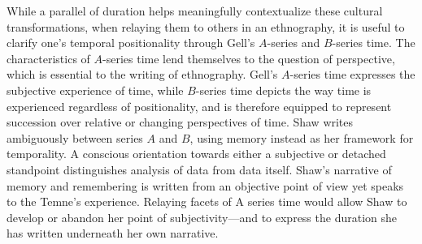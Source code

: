 While a parallel of duration helps meaningfully contextualize these
cultural transformations, when relaying them to others in an
ethnography, it is useful to clarify one's temporal positionality
through Gell's $A$-series and $B$-series time. The characteristics of
$A$-series time lend themselves to the question of perspective, which is
essential to the writing of ethnography. Gell's $A$-series time expresses
the subjective experience of time, while $B$-series time depicts the way
time is experienced regardless of positionality, and is therefore
equipped to represent succession over relative or changing perspectives
of time. Shaw writes ambiguously between series $A$ and $B$, using memory
instead as her framework for temporality. A conscious orientation
towards either a subjective or detached standpoint distinguishes
analysis of data from data itself. Shaw's narrative of memory and
remembering is written from an objective point of view yet speaks to the
Temne's experience. Relaying facets of A series time would allow Shaw to
develop or abandon her point of subjectivity---and to express the
duration she has written underneath her own narrative.

